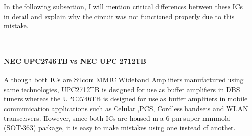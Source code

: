 In the following subsection, I will mention critical differences between these ICs in detail and explain why the circuit was not functioned properly due to this mistake.

\-\\[2.5cm]

\paragraph{NEC UPC2746TB vs NEC UPC 2712TB}
\- \indent
	Although both ICs are Silcom MMIC Wideband Amplifiers manufactured using same technologies, UPC2712TB is designed for use as buffer amplifiers in DBS tuners\cite{2712} whereas the UPC2746TB is designed for use as buffer amplifiers in mobile communication applications such as Celular ,PCS, Cordless handsets and WLAN transceivers\cite{2746}. However, since both ICs are housed in a 6-pin super minimold (SOT-363) package, it is easy to make mistakes using one instead of another.

